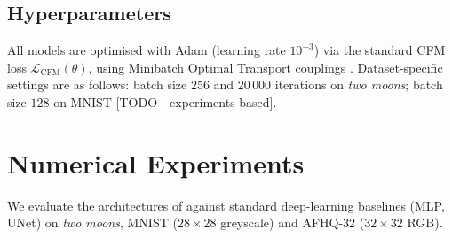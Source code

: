 \documentclass[a4paper,11pt]{article}
\theoremstyle{plain}{\theorembodyfont{\rmfamily}%
\newtheorem{proposition}[theorem]{Proposition}}
\theoremstyle{plain}{\theorembodyfont{\rmfamily}%
\newtheorem{notation}[theorem]{Notation}}
\theoremstyle{plain}{\theorembodyfont{\rmfamily}%
\newtheorem{assumption}[theorem]{Assumption}}
\theoremstyle{plain}{\theorembodyfont{\rmfamily}%
\newtheorem{problem}[theorem]{Problem}}
\theoremstyle{plain}{\theorembodyfont{\rmfamily}%
\newtheorem{example}[theorem]{Example}}
\theoremstyle{plain}{\theorembodyfont{\rmfamily}%
\newtheorem{remark}[theorem]{Remark}}
\theoremstyle{plain}{\theorembodyfont{\rmfamily}%
\newtheorem{definition}[theorem]{Definition}}
\theoremstyle{plain}{\theorembodyfont{\rmfamily}%
\newtheorem{question}[theorem]{Question}}
\numberwithin{equation}{section}
\begin{document}
\subsection{Hyperparameters}
\label{subsec:hyperparams}

All models are optimised with Adam (learning rate $10^{-3}$) via the standard
CFM loss $\mathcal{L}_{\text{CFM}}(\theta)$, using Minibatch Optimal Transport couplings
\cite{tong2024improving}. Dataset-specific settings are as follows: batch size $256$ and
$20\,000$ iterations on \textit{two moons}; batch size $128$ on MNIST [TODO - experiments based].

\section{Numerical Experiments}
\label{sec:experiments}

We evaluate the architectures of  against standard
deep-learning baselines (MLP, UNet) on \textit{two moons}, MNIST
($28\times28$ greyscale) and AFHQ-32 ($32\times32$ RGB).
\end{document}

